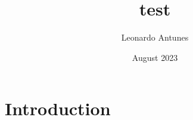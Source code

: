 \documentclass{article}
\title{test}
\author{Leonardo Antunes}
\date{August 2023}
\begin{document}
\maketitle

\section{Introduction}
\end{document}
